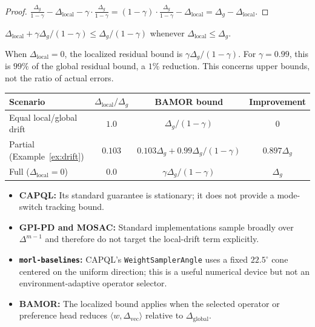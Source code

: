 \begin{proof}
$\frac{\Delta_g}{1{-}\gamma} - \Delta_{\mathrm{local}} - \gamma \cdot \frac{\Delta_g}{1{-}\gamma} = (1{-}\gamma) \cdot \frac{\Delta_g}{1{-}\gamma} - \Delta_{\mathrm{local}} = \Delta_g - \Delta_{\mathrm{local}}$.
\end{proof}

\begin{corollary}
$\Delta_{\mathrm{local}} + \gamma \Delta_g/(1{-}\gamma) \le \Delta_g/(1{-}\gamma)$ whenever $\Delta_{\mathrm{local}} \le \Delta_g$.
\end{corollary}

\begin{corollary}
When $\Delta_{\mathrm{local}} = 0$, the localized residual bound is $\gamma\Delta_g/(1{-}\gamma)$. For $\gamma=0.99$, this is $99\%$ of the global residual bound, a $1\%$ reduction. This concerns upper bounds, not the ratio of actual errors.
\end{corollary}

\begin{center}
\begin{tabular}{lccc}
\toprule
\textbf{Scenario} & $\Delta_{\mathrm{local}}/\Delta_g$ & \textbf{BAMOR bound} & \textbf{Improvement} \\
\midrule
Equal local/global drift & $1.0$ & $\Delta_g/(1{-}\gamma)$ & $0$ \\
Partial (Example~\ref{ex:drift}) & $0.103$ & $0.103\Delta_g + 0.99\Delta_g/(1{-}\gamma)$ & $0.897\Delta_g$ \\
Full ($\Delta_{\mathrm{local}} = 0$) & $0.0$ & $\gamma\Delta_g/(1{-}\gamma)$ & $\Delta_g$ \\
\bottomrule
\end{tabular}
\end{center}

\begin{remark}
\begin{itemize}
    \item \textbf{CAPQL:} Its standard guarantee is stationary; it does not provide a mode-switch tracking bound.
    \item \textbf{GPI-PD and MOSAC:} Standard implementations sample broadly over $\Delta^{m-1}$ and therefore do not target the local-drift term explicitly.
    \item \textbf{\texttt{morl-baselines}:} CAPQL's \texttt{WeightSamplerAngle} uses a fixed $22.5^\circ$ cone centered on the uniform direction; this is a useful numerical device but not an environment-adaptive operator selector.
    \item \textbf{BAMOR:} The localized bound applies when the selected operator or preference head reduces $\langle w,\Delta_{\mathrm{vec}}\rangle$ relative to $\Delta_{\mathrm{global}}$.
\end{itemize}
\end{remark}

